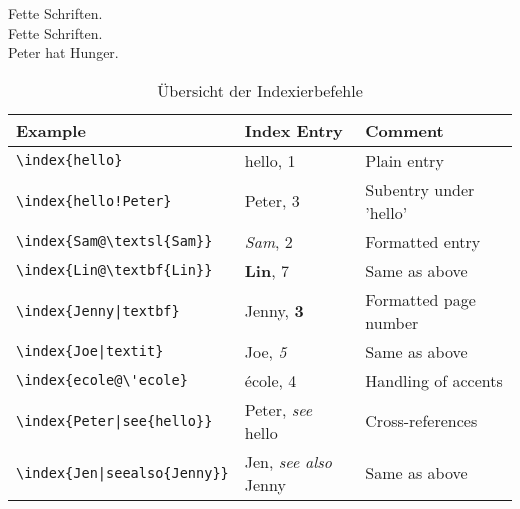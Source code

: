 \documentclass[10pt, a4paper]{article}
\begin{document}
\noindent Fette Schriften.\\
Fette Schriften.\\
Peter hat Hunger.

\begin{table}[htbp]
\caption{Übersicht der Indexierbefehle}
\begin{center}
\begin{tabular}{|l|l|l|}
\hline
Example &	Index Entry	 & Comment\\
\hline
\verb+\index{hello}+ &	hello, 1	& Plain entry \\
\verb+\index{hello!Peter}+	&  Peter, 3	 &Subentry under 'hello'\\
\verb+\index{Sam@\textsl{Sam}}+&	\textsl{Sam}, 2	&Formatted entry\\
\verb+\index{Lin@\textbf{Lin}}	+&	\textbf{Lin}, 7	&Same as above\\
\verb+\index{Jenny|textbf}+&	Jenny, \textbf{3}	&Formatted page number\\
\verb+\index{Joe|textit}+&	Joe, \textit{5}	&Same as above\\
\verb+\index{ecole@\'ecole}+&	école, 4&	Handling of accents\\
\verb+\index{Peter|see{hello}}+&	Peter, \textit{see} hello	&Cross-references\\
\verb+\index{Jen|seealso{Jenny}}+ &	Jen, \textit{see also} Jenny	&Same as above\\
\hline

\end{tabular}
\end{center}
\label{default}
\end{table}%

\printindex %
\end{document}
